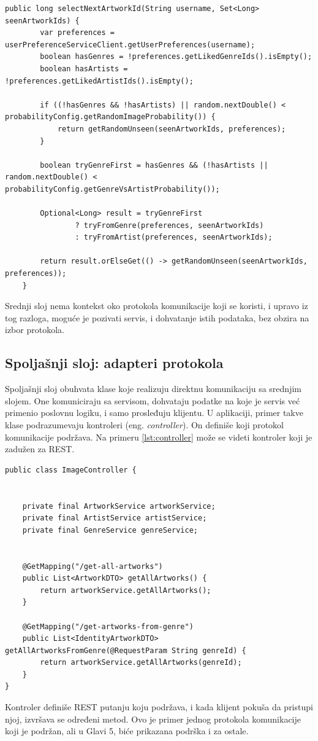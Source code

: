 \documentclass[12pt,oneside]{memoir}
\begin{document}
\begin{lstlisting}
public long selectNextArtworkId(String username, Set<Long> seenArtworkIds) {
        var preferences = userPreferenceServiceClient.getUserPreferences(username);
        boolean hasGenres = !preferences.getLikedGenreIds().isEmpty();
        boolean hasArtists = !preferences.getLikedArtistIds().isEmpty();

        if ((!hasGenres && !hasArtists) || random.nextDouble() < probabilityConfig.getRandomImageProbability()) {
            return getRandomUnseen(seenArtworkIds, preferences);
        }

        boolean tryGenreFirst = hasGenres && (!hasArtists || random.nextDouble() < probabilityConfig.getGenreVsArtistProbability());

        Optional<Long> result = tryGenreFirst
                ? tryFromGenre(preferences, seenArtworkIds)
                : tryFromArtist(preferences, seenArtworkIds);

        return result.orElseGet(() -> getRandomUnseen(seenArtworkIds, preferences));
    }
\end{lstlisting}

Srednji sloj nema kontekst oko protokola komunikacije koji se koristi, i upravo iz tog razloga, moguće je pozivati 
servis, i dohvatanje istih podataka, bez obzira na izbor protokola. 

\subsection{Spoljašnji sloj: adapteri protokola}
Spoljašnji sloj obuhvata klase koje realizuju direktnu komunikaciju sa srednjim slojem. One komuniciraju sa servisom, 
dohvataju podatke na koje je servis već primenio poslovnu logiku, i samo prosleđuju klijentu. U aplikaciji, primer 
takve klase podrazumevaju kontroleri (eng. \textit{controller}). On definiše koji protokol komunikacije podržava.
Na primeru \ref{lst:controller} može se videti kontroler koji je zadužen za REST.  


\begin{lstlisting}
public class ImageController {


    private final ArtworkService artworkService;
    private final ArtistService artistService;
    private final GenreService genreService;


    @GetMapping("/get-all-artworks")
    public List<ArtworkDTO> getAllArtworks() {
        return artworkService.getAllArtworks();
    }

    @GetMapping("/get-artworks-from-genre")
    public List<IdentityArtworkDTO> getAllArtworksFromGenre(@RequestParam String genreId) {
        return artworkService.getAllArtworks(genreId);
    }
}
\end{lstlisting}
Kontroler definiše REST putanju koju podržava, i kada klijent pokuša da pristupi njoj, izvršava se određeni metod. 
Ovo je primer jednog protokola komunikacije koji je podržan, ali u Glavi 5, biće prikazana podrška i za ostale. 
\end{document}
